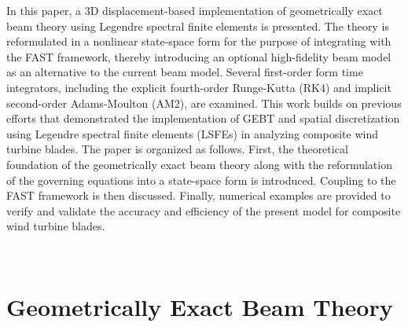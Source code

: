 \documentclass{aiaa-tc}
\begin{document}
In this paper, a 3D displacement-based
implementation of geometrically exact beam theory using Legendre
spectral finite elements is presented. The theory is reformulated in a
nonlinear state-space form for the purpose of integrating with the FAST
framework, thereby introducing an optional high-fidelity beam model as an
alternative to the current beam model. Several first-order form time integrators, including the explicit fourth-order Runge-Kutta (RK4) and implicit second-order Adams-Moulton (AM2), are examined. This work builds on previous efforts
that demonstrated the implementation of GEBT and spatial discretization using Legendre spectral finite elements
(LSFEs)\cite{Wang:GEBT2013,Wang:SFE2013,Wang:GEBT2014,Sprague:FAST2014} in analyzing composite wind turbine blades. The paper is organized as
follows.  First, the theoretical foundation of the geometrically exact beam
theory along with the reformulation of the governing equations into a
state-space form is introduced. Coupling to the FAST framework is then
discussed. Finally, numerical examples are
provided to verify and validate the accuracy and efficiency of the present model for
composite wind turbine blades. 

~

\section{Geometrically Exact Beam Theory}
\end{document}

